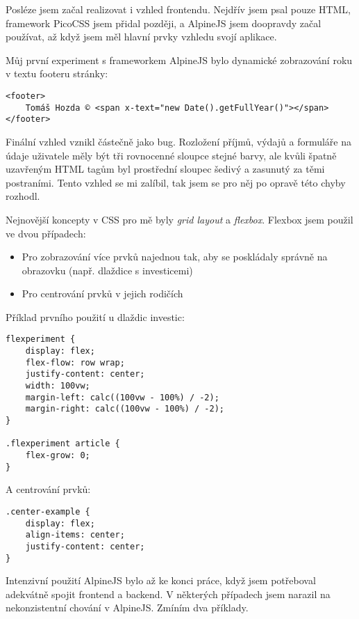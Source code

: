 \documentclass[11pt,a4paper,twoside,openright]{report}
\begin{document}
Posléze jsem začal realizovat i vzhled frontendu. Nejdřív jsem psal pouze HTML, framework PicoCSS jsem přidal
později, a AlpineJS jsem doopravdy začal používat, až když jsem měl hlavní prvky vzhledu svojí aplikace.

Můj první experiment s frameworkem AlpineJS bylo dynamické zobrazování roku v textu footeru stránky:

\begin{verbatim}
<footer>
    Tomáš Hozda © <span x-text="new Date().getFullYear()"></span>
</footer>
\end{verbatim}

Finální vzhled vznikl částečně jako bug. Rozložení příjmů, výdajů a formuláře na údaje uživatele měly být
tři rovnocenné sloupce stejné barvy, ale kvůli špatně uzavřeným HTML tagům byl prostřední sloupec šedivý a zasunutý
za těmi postraními. Tento vzhled se mi zalíbil, tak jsem se pro něj po opravě této chyby rozhodl.

Nejnovější koncepty v CSS pro mě byly \emph{grid layout} a \emph{flexbox}. Flexbox jsem použil ve dvou případech:

\begin{itemize}
  \item Pro zobrazování více prvků najednou tak, aby se poskládaly správně na obrazovku (např. dlaždice s investicemi)
  \item Pro centrování prvků v jejich rodičích
\end{itemize}

Příklad prvního použití u dlaždic investic:

\begin{verbatim}
flexperiment {
    display: flex;
    flex-flow: row wrap;
    justify-content: center;
    width: 100vw;
    margin-left: calc((100vw - 100%) / -2);
    margin-right: calc((100vw - 100%) / -2);
}

.flexperiment article {
    flex-grow: 0;
}
\end{verbatim}

A centrování prvků:

\begin{verbatim}
.center-example {
    display: flex;
    align-items: center;
    justify-content: center;
}
\end{verbatim}

Intenzivní použití AlpineJS bylo až ke konci práce, když jsem potřeboval adekvátně spojit frontend a backend.
V některých případech jsem narazil na nekonzistentní chování v AlpineJS. Zmíním dva příklady.
\end{document}
